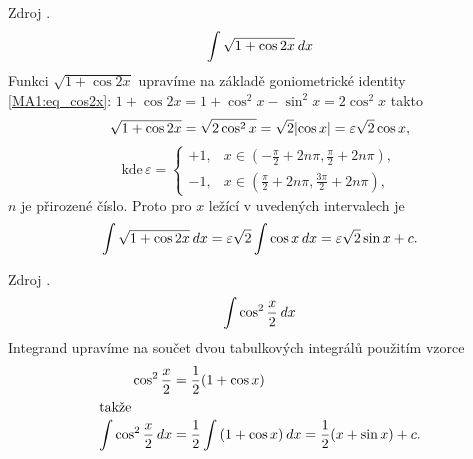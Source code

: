       \begin{example}
        Zdroj \cite[s.~30]{Knichal}.
        \begin{equation}\label{MA:int_ex_04}
          \int{\sqrt{1+\cos2x}\hspace{2pt}dx}
        \end{equation}
        Funkci $\sqrt{1+\cos2x}$ upravíme na základě goniometrické identity \ref{MA1:eq_cos2x}:
        \(1+\cos2x = 1+\cos^2x-\sin^2x=2\cos^2x\) takto
        \begin{equation*}
          \sqrt{1+\cos2x} =\sqrt{2\cos^2x} = \sqrt{2}\abs{\cos x} = \varepsilon\sqrt{2}\cos x, 
        \end{equation*}
        \begin{equation*}
          \text{kde}\,\varepsilon =
            \begin{cases} 
             +1, &  x\in \left(-\frac{\pi}{2}+2n\pi,\frac{\pi}{2}+2n\pi\right), \\
             -1, &  x\in \left(\frac{\pi}{2}+2n\pi,\frac{3\pi}{2}+2n\pi\right),
            \end{cases}
        \end{equation*}
        $n$ je přirozené číslo. Proto pro $x$ ležící v uvedených intervalech je
        \begin{equation*}
          \int\sqrt{1+\cos2x}\hspace{2pt}dx = \varepsilon\sqrt{2}\int\cos x\hspace{2pt}dx 
                                 = \varepsilon\sqrt{2}\sin x + c.
        \end{equation*}
      \end{example}
      
      \begin{example}Zdroj \cite[s.~30]{Knichal}.
        \begin{equation}\label{MA:int_ex_05}
          \int\cos^2\frac{x}{2}\hspace{2pt}dx
        \end{equation}
        Integrand upravíme na součet dvou tabulkových integrálů použitím vzorce
        \begin{align*}
          \cos^2\frac{x}{2} &= \frac{1}{2}(1+\cos x)     \\ 
          \shortintertext{takže}
          \int{\cos^2\frac{x}{2}}\hspace{2pt}dx 
                            &= \frac{1}{2}\int{(1+\cos x)}\hspace{2pt}dx = \frac{1}{2}(x+\sin x) + c.
        \end{align*}          
      \end{example}
      
